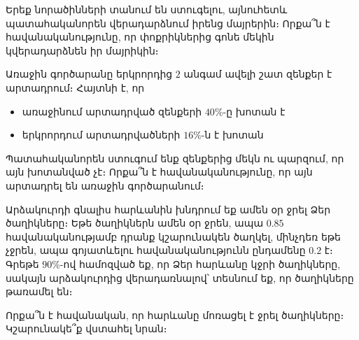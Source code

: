 \begin{problem}
Երեք նորածինների տանում են ստուգելու, այնուհետև պատահականորեն վերադարձնում իրենց մայրերին։ Որքա՞ն է հավանա\-կանությունը, որ փոքրիկներից գոնե մեկին կվերադարձնեն իր մայրիկին։
\end{problem}




\begin{problem}
Առաջին գործարանը երկրորդից $2$ անգամ ավելի շատ զենքեր է արտադրում։ Հայտնի է, որ 
\begin{itemize}
    \item առաջինում արտադրված զենքերի $40\%$-ը խոտան է
    \item երկրորդում արտադրվածների $16\%$-ն է խոտան
\end{itemize}
Պատահականորեն ստուգում ենք զենքերից մեկն ու պարզում, որ այն խոտանված չէ։ Որքա՞ն է հավանականությունը, որ այն արտադրել են առաջին գործարանում։
\end{problem}

\begin{problem}
Արձակուրդի գնալիս հարևանին խնդրում եք ամեն օր ջրել Ձեր ծաղիկները։ Եթե ծաղիկներն ամեն օր ջրեն, ապա $0.85$ հա\-վա\-նականությամբ դրանք կշարունակեն ծաղկել, մինչդեռ եթե չջրեն, ապա գոյատևելու հավանականությունն ընդամենը $0.2$ է։ Գրեթե $90\%$-ով համոզված եք, որ Ձեր հարևանը կջրի ծաղիկները, սակայն արձակուրդից վերադառնալով՝ տեսնում եք, որ ծաղիկները թառամել են։ 

Որքա՞ն է հավանական, որ հարևանը մոռացել է ջրել ծաղիկները։ Կշարունակե՞ք վստահել նրան։
\end{problem}


